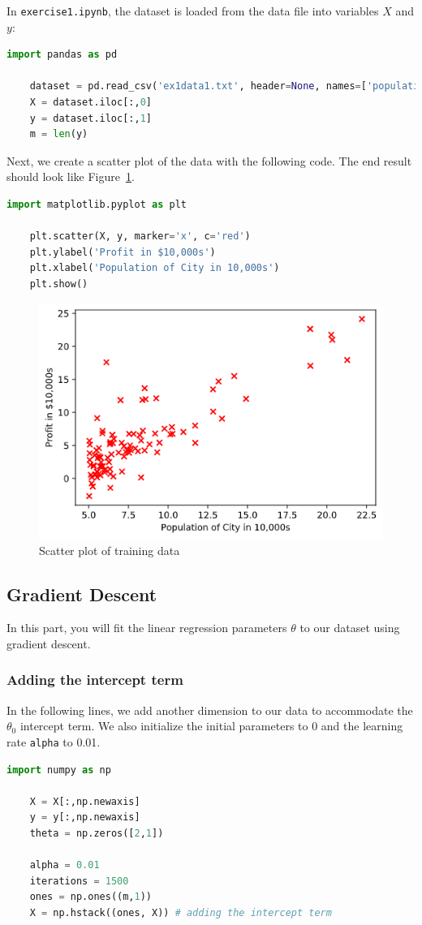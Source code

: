 \documentclass[12pt]{article}
\begin{document}
In \texttt{exercise1.ipynb}, the dataset is loaded from the data file into variables $X$ and $y$:
\begin{lstlisting}[language=Python]
    import pandas as pd 

    dataset = pd.read_csv('ex1data1.txt', header=None, names=['population', 'profit'])
    X = dataset.iloc[:,0]
    y = dataset.iloc[:,1]
    m = len(y)
\end{lstlisting}

Next, we create a scatter plot of the data with the following code. The end result should look like Figure~\ref{fig:scatter1}.

\begin{lstlisting}[language=Python]
    import matplotlib.pyplot as plt

    plt.scatter(X, y, marker='x', c='red')
    plt.ylabel('Profit in $10,000s')
    plt.xlabel('Population of City in 10,000s')
    plt.show()
\end{lstlisting}

\begin{figure}[h!]
  \centering
  \includegraphics[scale=0.6]{scatter1.png}
  \caption{Scatter plot of training data}
  \label{fig:scatter1}
\end{figure}

\subsection{Gradient Descent}
In this part, you will fit the linear regression parameters $\theta$ to our dataset using gradient descent.
\subsubsection{Adding the intercept term}
In the following lines, we add another dimension to our data to accommodate the $\theta_0$ intercept term. We also initialize the initial parameters to 0 and the learning rate \texttt{alpha} to 0.01.
\begin{lstlisting}[language=Python]
    import numpy as np
    
    X = X[:,np.newaxis]
    y = y[:,np.newaxis]
    theta = np.zeros([2,1])

    alpha = 0.01
    iterations = 1500
    ones = np.ones((m,1))
    X = np.hstack((ones, X)) # adding the intercept term
\end{lstlisting}
\end{document}
